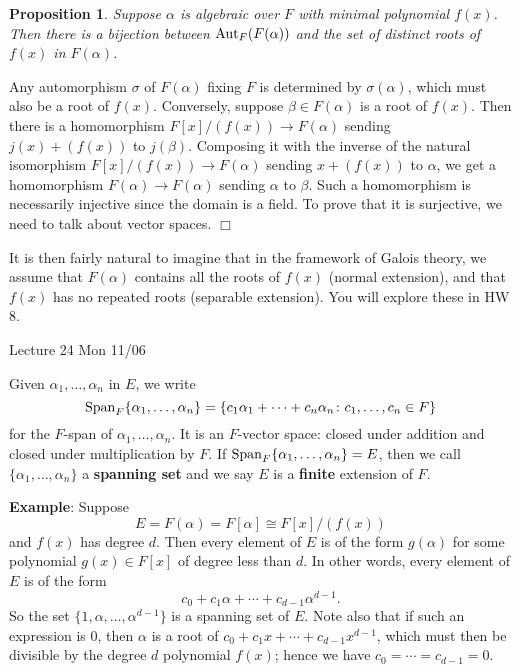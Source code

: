 \documentclass{article}
\def\Aut{{\rm Aut}}
\def\tSpan{{\rm Span}}
\newtheorem{proposition}[subsection]{Proposition}
\newenvironment{proof}{\noindent {\bf Proof:}}{$\Box$ \vspace{2 ex}}
\newcommand{\add}[1]{{\color{blue} #1}}
\begin{document}
\begin{proposition}
    \label{prop:ab}
    Suppose $\alpha$ is algebraic over $F$ with minimal polynomial $f(x)$. Then there is a bijection between $\Aut_F(F(\alpha))$ and the set of distinct roots of $f(x)$ in $F(\alpha)$.
\end{proposition}

\begin{proof}
    Any automorphism $\sigma$ of $F(\alpha)$ fixing $F$ is determined by $\sigma(\alpha)$, which must also be a root of $f(x)$. Conversely, suppose $\beta\in F(\alpha)$ is a root of $f(x)$. Then there is a homomorphism $F[x]/(f(x))\rightarrow F(\alpha)$ sending $j(x)+(f(x))$ to $j(\beta)$. Composing it with the inverse of the natural isomorphism $F[x]/(f(x))\rightarrow F(\alpha)$ sending $x + (f(x))$ to $\alpha$, we get a homomorphism $F(\alpha)\rightarrow F(\alpha)$ sending $\alpha$ to $\beta$. Such a homomorphism is necessarily injective since the domain is a field. To prove that it is surjective, we need to talk about vector spaces.
\end{proof}

It is then fairly natural to imagine that in the framework of Galois theory, we assume that $F(\alpha)$ contains all the roots of $f(x)$ (normal extension), and that $f(x)$ has no repeated roots (separable extension). You will explore these in HW 8.

\begin{center}
    \add{Lecture 24 Mon 11/06}
\end{center}
Given $\alpha_1,\ldots,\alpha_n$ in $E$, we write
$$\tSpan_F\{\alpha_1,\ldots,\alpha_n\} = \{c_1\alpha_1 + \cdots + c_n\alpha_n\colon c_1,\ldots,c_n\in F\}$$
for the $F$-span of $\alpha_1,\ldots,\alpha_n$. It is an $F$-vector space: closed under addition and closed under multiplication by $F$. If $\tSpan_F\{\alpha_1,\ldots,\alpha_n\} = E$, then we call $\{\alpha_1,\ldots,\alpha_n\}$ a \textbf{spanning set} and we say $E$ is a \textbf{finite} extension of $F$. 

\vspace{5pt}
\noindent\textbf{Example}: Suppose $$E = F(\alpha) = F[\alpha] \cong F[x]/(f(x))$$ and $f(x)$ has degree $d$. Then every element of $E$ is of the form $g(\alpha)$ for some polynomial $g(x)\in F[x]$ of degree less than $d$. In other words, every element of $E$ is of the form $$c_0 + c_1\alpha + \cdots + c_{d-1}\alpha^{d-1}.$$
So the set $\{1,\alpha,\ldots,\alpha^{d-1}\}$ is a spanning set of $E$. Note also that if such an expression is $0$, then $\alpha$ is a root of $c_0 + c_1x + \cdots + c_{d-1}x^{d-1}$, which must then be divisible by the degree $d$ polynomial $f(x)$; hence we have $c_0 = \cdots = c_{d-1} = 0$. 
\end{document}
